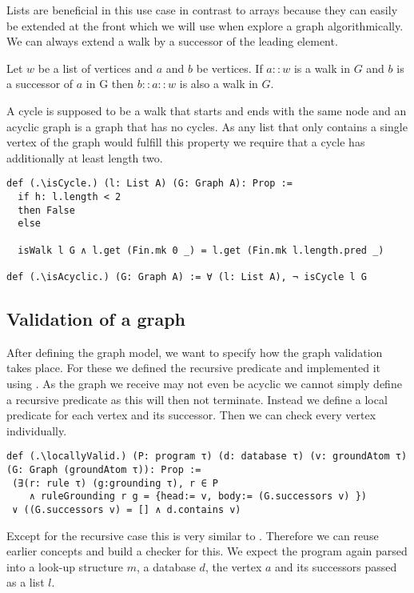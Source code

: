 Lists are beneficial in this use case in contrast to arrays because they can easily be extended at the front which we will use when explore a graph algorithmically. We can always extend a walk by a successor of the leading element.

\begin{lemma}[\isWalkextendssuccessors]
    Let $w$ be a list of vertices and $a$ and $b$ be vertices.
    If $a::w$ is a walk in $G$ and $b$ is a successor of $a$ in G then $b::a::w$ is also a walk in $G$.
\end{lemma}

A cycle is supposed to be a walk that starts and ends with the same node and an acyclic graph is a graph that has no cycles. As any list that only contains a single vertex of the graph would fulfill this property we require that a cycle has additionally at least length two.

\begin{lstlisting}
def (.\isCycle.) (l: List A) (G: Graph A): Prop :=
  if h: l.length < 2
  then False
  else

  isWalk l G ∧ l.get (Fin.mk 0 _) = l.get (Fin.mk l.length.pred _)

def (.\isAcyclic.) (G: Graph A) := ∀ (l: List A), ¬ isCycle l G
\end{lstlisting}

\subsection{Validation of a graph}

After defining the graph model, we want to specify how the graph validation takes place. For these we defined the recursive predicate \isValid and implemented it using \treeValidator. As the graph we receive may not even be acyclic we cannot simply define a recursive predicate as this will then not terminate. Instead we define a local predicate for each vertex and its successor. Then we can check every vertex individually.

\begin{lstlisting}
def (.\locallyValid.) (P: program τ) (d: database τ) (v: groundAtom τ) (G: Graph (groundAtom τ)): Prop :=
 (∃(r: rule τ) (g:grounding τ), r ∈ P 
    ∧ ruleGrounding r g = {head:= v, body:= (G.successors v) }) 
 ∨ ((G.successors v) = [] ∧ d.contains v)
\end{lstlisting}

Except for the recursive case this is very similar to \isValid. Therefore we can reuse earlier concepts and build a checker for this. We expect the program again parsed into a look-up structure $m$, a database $d$, the vertex $a$ and its successors passed as a list $l$.

